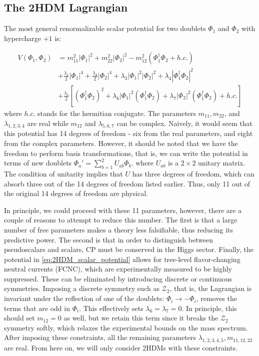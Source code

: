 \subsection{The 2HDM Lagrangian}
The most general renormalizable scalar potential for two doublets $\Phi_1$ and $\Phi_2$ with hypercharge $+1$ is:

\begin{align*}
  V(\Phi_1,\Phi_2) &= m_{11}^2|\Phi_1|^2 + m_{22}^2|\Phi_2|^2 - m_{12}^2\left(\Phi_1^\dagger\Phi_2 + h.c.\right)\\
&+\frac{\lambda_1}{2}|\Phi_1|^4 + \frac{\lambda_2}{2}|\Phi_2|^4+\lambda_3|\Phi_1|^2|\Phi_2|^2 + \lambda_4|\Phi_1^\dagger\Phi_2|^2\\
&+\frac{\lambda_5}{2}\left[\left(\Phi_1^\dagger\Phi_2 \right)^2+\lambda_6|\Phi_1|^2(\Phi_1^\dagger\Phi_2)+\lambda_7|\Phi_2|^2(\Phi_1^\dagger\Phi_2) + h.c.\right]
\label{eq:2HDM_scalar_potential}
\end{align*}
where $h.c.$ stands for the hermitian conjugate. The parameters $m_{11}, m_{22}$, and $\lambda_{1,2,3,4}$ are real while $m_{12}$ and $\lambda_{5,6,7}$ can be complex. Naively, it would seem that this potential has 14 degrees of freedom - six from the real parameters, and eight from the complex parameters. However, it should be noted that we have the freedom to perform basis transformations, that is, we can write the potential in terms of new doublets $\Phi_a' = \sum_{b=1}^2U_{ab}\Phi_b$. where $U_{ab}$ is a $2\times 2$ unitary matrix. The condition of unitarity implies that $U$ has three degrees of freedom, which can absorb three out of the 14 degrees of freedom listed earlier. Thus, only 11 out of the original 14 degrees of freedom are physical.

In principle, we could proceed with these 11 parameters, however, there are a couple of reasons to attempt to reduce this number. The first is that a large number of free parameters makes a theory less falsifiable, thus reducing its predictive power. The second is that in order to distinguish between pseudoscalars and scalars, CP must be conserved in the Higgs sector. Finally, the potential in \autoref{eq:2HDM_scalar_potential} allows for tree-level flavor-changing neutral currents (FCNC), which are experimentally measured to be highly suppressed. These can be eliminated by introducing discrete or continuous symmetries. Imposing a discrete symmetry such as $\mathcal{Z}_2$, that is, the Lagrangian is invariant under the reflection of one of the doublets: $\Phi_i\rightarrow-\Phi_i$, removes the terms that are odd in $\Phi_i$. This effectively sets $\lambda_6=\lambda_7 = 0$. In principle, this should set $m_{12} = 0$ as well, but we retain this term since it breaks the $\mathcal{Z}_2$ symmetry softly, which relaxes the experimental bounds on the mass spectrum.
After imposing these constraints, all the remaining parameters $\lambda_{1,2,3,4,5}, m_{11,12,22}$ are real. From here on, we will only consider 2HDMs with these constraints. 

